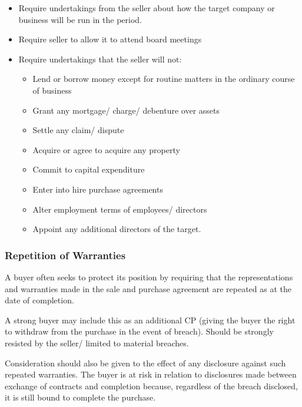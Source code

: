 \documentclass[
]{article}
\newenvironment{Shaded}{}{}
\newcommand{\NormalTok}[1]{#1}
\providecommand{\tightlist}{%
  \setlength{\itemsep}{0pt}\setlength{\parskip}{0pt}}
\begin{document}
\begin{itemize}
\tightlist
\item
  Require undertakings from the seller about how the target company or
  business will be run in the period.
\item
  Require seller to allow it to attend board meetings
\item
  Require undertakings that the seller will not:

  \begin{itemize}
  \tightlist
  \item
    Lend or borrow money except for routine matters in the ordinary
    course of business
  \item
    Grant any mortgage/ charge/ debenture over assets
  \item
    Settle any claim/ dispute
  \item
    Acquire or agree to acquire any property
  \item
    Commit to capital expenditure
  \item
    Enter into hire purchase agreements
  \item
    Alter employment terms of employees/ directors
  \item
    Appoint any additional directors of the target.
  \end{itemize}
\end{itemize}

\hypertarget{repetition-of-warranties}{%
\subsubsection{Repetition of
Warranties}\label{repetition-of-warranties}}

\begin{Shaded}
\begin{Highlighting}[]
\NormalTok{A buyer often seeks to protect its position by requiring that the representations and warranties made in the sale and purchase agreement are repeated as at the date of completion.}
\end{Highlighting}
\end{Shaded}

A strong buyer may include this as an additional CP (giving the buyer
the right to withdraw from the purchase in the event of breach). Should
be strongly resisted by the seller/ limited to material breaches.

Consideration should also be given to the effect of any disclosure
against such repeated warranties. The buyer is at risk in relation to
disclosures made between exchange of contracts and completion because,
regardless of the breach disclosed, it is still bound to complete the
purchase.
\end{document}
